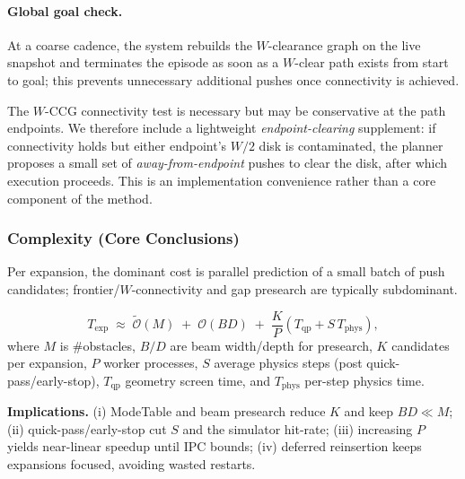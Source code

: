 \paragraph{Global goal check.}
At a coarse cadence, the system rebuilds the $W$-clearance graph on the live
snapshot and terminates the episode as soon as a $W$-clear path exists from start
to goal; this prevents unnecessary additional pushes once connectivity is achieved.

\begin{remark}
The $W$-CCG connectivity test is necessary but may be conservative at the path
endpoints. We therefore include a lightweight \emph{endpoint-clearing} supplement:
if connectivity holds but either endpoint’s $W/2$ disk is contaminated, the planner
proposes a small set of \emph{away-from-endpoint} pushes to clear the disk, after
which execution proceeds. This is an implementation convenience rather than a core
component of the method.
\end{remark}

\subsubsection{Complexity (Core Conclusions)}\label{subsubsec:complexity}
Per expansion, the dominant cost is parallel prediction of a small batch of push
candidates; frontier/$W$-connectivity and gap presearch are typically subdominant.

\[
T_{\text{exp}} \;\approx\; \tilde{\mathcal O}(M) \;+\; \mathcal O(BD) \;+\; \frac{K}{P}\!\left(T_{\text{qp}} + S\,T_{\text{phys}}\right),
\]
where $M$ is \#obstacles, $B/D$ are beam width/depth for presearch, $K$ candidates per
expansion, $P$ worker processes, $S$ average physics steps (post quick-pass/early-stop),
$T_{\text{qp}}$ geometry screen time, and $T_{\text{phys}}$ per-step physics time.

\noindent\textbf{Implications.}
(i) ModeTable and beam presearch reduce $K$ and keep $BD\!\ll\!M$;
(ii) quick-pass/early-stop cut $S$ and the simulator hit-rate;
(iii) increasing $P$ yields near-linear speedup until IPC bounds;
(iv) deferred reinsertion keeps expansions focused, avoiding wasted restarts.

